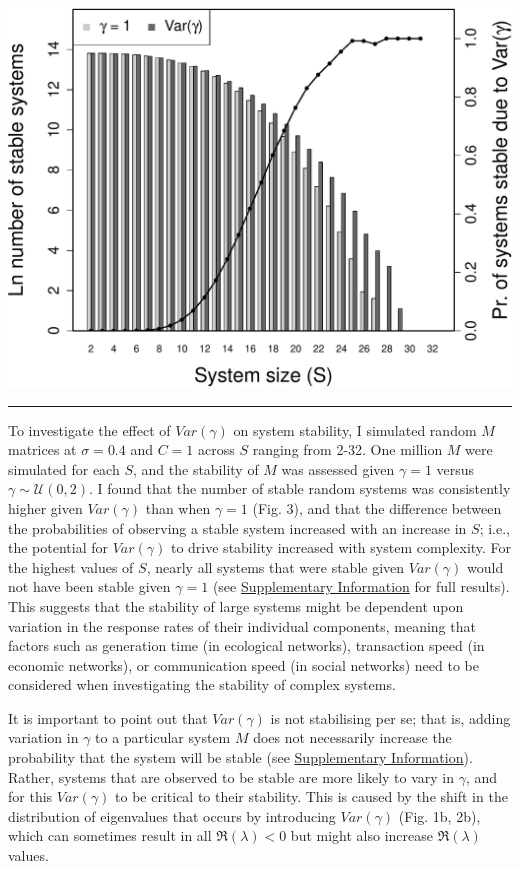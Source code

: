 \documentclass[]{article}
\begin{document}
\includegraphics{unnamed-chunk-9-1.pdf}

\begin{center}\rule{0.5\linewidth}{\linethickness}\end{center}

To investigate the effect of \(Var(\gamma)\) on system stability, I
simulated random \(M\) matrices at \(\sigma = 0.4\) and \(C = 1\) across
\(S\) ranging from 2-32. One million \(M\) were simulated 
for each \(S\), and the stability of \(M\) was assessed given \(\gamma = 1\)
versus \(\gamma \sim \mathcal{U}(0, 2)\). I found that the number of stable 
random systems was
consistently higher given \(Var(\gamma)\) than when \(\gamma = 1\) (Fig.
3), and that the difference between the probabilities of observing a
stable system increased with an increase in \(S\); i.e., the potential
for \(Var(\gamma)\) to drive stability increased with system complexity.
For the highest values of \(S\), nearly all systems that were stable
given \(Var(\gamma)\) would not have been stable given \(\gamma = 1\) (see
\hyperlink{SIstart}{Supplementary Information} for full results). This 
suggests that the
stability of large systems might be dependent upon variation in the
response rates of their individual components, meaning that factors such
as generation time (in ecological networks), transaction speed (in
economic networks), or communication speed (in social networks) need to
be considered when investigating the stability of complex systems.

It is important to point out 
that \(Var(\gamma)\) is not stabilising per se; that is,
adding variation in \(\gamma\) to a particular system \(M\) does not
necessarily increase the probability that the system will be stable (see
\hyperlink{SIstart}{Supplementary Information}). Rather, systems that are 
observed to be stable are more likely to vary in \(\gamma\), and for this
\(Var(\gamma)\) to be critical to their stability. This is caused by the
shift in the distribution of eigenvalues that occurs by introducing
\(Var(\gamma)\) (Fig. 1b, 2b), which can sometimes result in all
\(\Re(\lambda) < 0\) but might also increase \(\Re(\lambda)\) values. 
\end{document}
